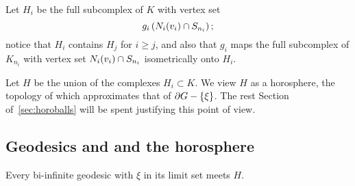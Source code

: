 \documentclass[a4paper]{article}
\begin{document}
Let $H_i$ be the full subcomplex of $K$ with vertex set
\begin{equation*}
  g_i\left(N_i(v_i) \cap S_{n_i}\right);
\end{equation*}
notice that $H_i$ contains $H_j$ for $i \geq j$, and also that $g_i$ maps the
full subcomplex of $K_{n_i}$ with vertex set $N_i(v_i) \cap S_{n_i}$
isometrically onto $H_i$. 

Let $H$ be the union of the complexes $H_i \subset K$. We view $H$ as a
horosphere, the topology of which approximates that of $\partial G - \left\{\xi\right\}$.
The rest Section of~\ref{sec:horoballs} will be spent justifying this point of view.

\subsection{Geodesics and and the horosphere}

\begin{lemma}\label{lem:geodesicsmeethorosphere}
  Every bi-infinite geodesic with $\xi$ in its limit set meets $H$.
\end{lemma}
\end{document}

